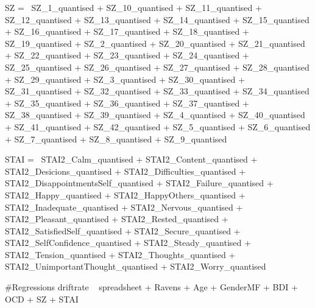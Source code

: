 \documentclass[]{article}
\newenvironment{Shaded}{\begin{snugshade}}{\end{snugshade}}
\newcommand{\StringTok}[1]{\textcolor[rgb]{0.31,0.60,0.02}{#1}}
\begin{document}
\begin{Shaded}
\begin{Highlighting}[]
\StringTok{SZ =~ SZ_1_quantised    +}
\StringTok{      SZ_10_quantised   +   }
\StringTok{      SZ_11_quantised + }
\StringTok{      SZ_12_quantised + }
\StringTok{      SZ_13_quantised + }
\StringTok{      SZ_14_quantised + }
\StringTok{      SZ_15_quantised + }
\StringTok{      SZ_16_quantised + }
\StringTok{      SZ_17_quantised + }
\StringTok{      SZ_18_quantised + }
\StringTok{      SZ_19_quantised + }
\StringTok{      SZ_2_quantised + }
\StringTok{      SZ_20_quantised + }
\StringTok{      SZ_21_quantised + }
\StringTok{      SZ_22_quantised + }
\StringTok{      SZ_23_quantised + }
\StringTok{      SZ_24_quantised + }
\StringTok{      SZ_25_quantised + }
\StringTok{      SZ_26_quantised + }
\StringTok{      SZ_27_quantised + }
\StringTok{      SZ_28_quantised + }
\StringTok{      SZ_29_quantised + }
\StringTok{      SZ_3_quantised + }
\StringTok{      SZ_30_quantised + }
\StringTok{      SZ_31_quantised + }
\StringTok{      SZ_32_quantised + }
\StringTok{      SZ_33_quantised + }
\StringTok{      SZ_34_quantised + }
\StringTok{      SZ_35_quantised + }
\StringTok{      SZ_36_quantised + }
\StringTok{      SZ_37_quantised + }
\StringTok{      SZ_38_quantised + }
\StringTok{      SZ_39_quantised + }
\StringTok{      SZ_4_quantised + }
\StringTok{      SZ_40_quantised + }
\StringTok{      SZ_41_quantised + }
\StringTok{      SZ_42_quantised + }
\StringTok{      SZ_5_quantised + }
\StringTok{      SZ_6_quantised + }
\StringTok{      SZ_7_quantised + }
\StringTok{      SZ_8_quantised + }
\StringTok{      SZ_9_quantised}

\StringTok{STAI =~ STAI2_Calm_quantised +}
\StringTok{        STAI2_Content_quantised +}
\StringTok{        STAI2_Desicions_quantised +}
\StringTok{        STAI2_Difficulties_quantised +}
\StringTok{        STAI2_DisappointmentsSelf_quantised +}
\StringTok{        STAI2_Failure_quantised +}
\StringTok{        STAI2_Happy_quantised +}
\StringTok{        STAI2_HappyOthers_quantised +}
\StringTok{        STAI2_Inadequate_quantised +}
\StringTok{        STAI2_Nervous_quantised +}
\StringTok{        STAI2_Pleasant_quantised +}
\StringTok{        STAI2_Rested_quantised +}
\StringTok{        STAI2_SatisfiedSelf_quantised +}
\StringTok{        STAI2_Secure_quantised +}
\StringTok{        STAI2_SelfConfidence_quantised +}
\StringTok{        STAI2_Steady_quantised +}
\StringTok{        STAI2_Tension_quantised +}
\StringTok{        STAI2_Thoughts_quantised +}
\StringTok{        STAI2_UnimportantThought_quantised +}
\StringTok{        STAI2_Worry_quantised}


\StringTok{#Regressions}
\StringTok{driftrate ~ spreadsheet + Ravens + Age + GenderMF + BDI + OCD + SZ + STAI}


\end{Highlighting}
\end{Shaded}
\end{document}
